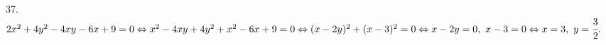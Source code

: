 37. $2x^2+4y^2-4xy-6x+9=0\Leftrightarrow x^2-4xy+4y^2+x^2-6x+9=0\Leftrightarrow (x-2y)^2+(x-3)^2=0\Leftrightarrow x-2y=0,\ x-3=0\Leftrightarrow x=3,\ y=\cfrac{3}{2}.$\\
